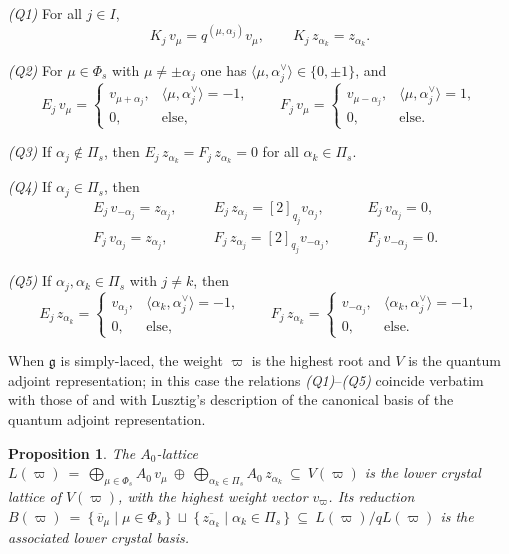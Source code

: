 \documentclass[12pt]{amsart}
\theoremstyle{plain}
\newtheorem{proposition}[theorem]{Proposition}
\theoremstyle{remark}
\newcommand{\g}{\mathfrak{g}}
\newcommand{\vp}{\varpi}
\newcommand{\Phis}{\Phi_{s}}
\newcommand{\Pis}{\Pi_{s}}
\begin{document}
\noindent\emph{(Q1)} For all $j\in I$,
\[
K_j\,v_\mu=q^{(\mu,\alpha_j)}v_\mu,\qquad K_j\,z_{\alpha_k}=z_{\alpha_k}.
\]

\noindent\emph{(Q2)} For $\mu\in\Phis$ with
$\mu\neq\pm\alpha_j$ one has $\langle\mu,\alpha_j^\vee\rangle\in\{0,\pm1\}$, and
\[
E_j\,v_\mu=
\begin{cases}v_{\mu+\alpha_j},&\langle\mu,\alpha_j^\vee\rangle=-1,\\ 0,&\text{else},\end{cases}
\qquad
F_j\,v_\mu=
\begin{cases}v_{\mu-\alpha_j},&\langle\mu,\alpha_j^\vee\rangle=1,\\ 0,&\text{else}.\end{cases}
\]

\noindent\emph{(Q3)} If $\alpha_j\notin\Pis$, then
$E_j\,z_{\alpha_k}=F_j\,z_{\alpha_k}=0$ for all $\alpha_k\in\Pis$.

\noindent\emph{(Q4)} If $\alpha_j\in\Pis$, then
\[
\begin{aligned}
&E_j\,v_{-\alpha_j}=z_{\alpha_j}, &\quad &E_j\,z_{\alpha_j}=[2]_{q_j}v_{\alpha_j}, &\quad &E_j\,v_{\alpha_j}=0,\\
&F_j\,v_{\alpha_j}=z_{\alpha_j}, &\quad &F_j\,z_{\alpha_j}=[2]_{q_j}v_{-\alpha_j}, &\quad &F_j\,v_{-\alpha_j}=0.
\end{aligned}
\]

\noindent\emph{(Q5)} If $\alpha_j,\alpha_k\in\Pis$ with
$j\neq k$, then
\[
E_j\,z_{\alpha_k}=
\begin{cases}v_{\alpha_j},&\langle\alpha_k,\alpha_j^\vee\rangle=-1,\\ 0,&\text{else},\end{cases}
\qquad
F_j\,z_{\alpha_k}=
\begin{cases}v_{-\alpha_j},&\langle\alpha_k,\alpha_j^\vee\rangle=-1,\\ 0,&\text{else}.\end{cases}
\]

When $\g$ is simply-laced, the weight $\vp$ is the highest root
and $V$ is the quantum adjoint representation; in this case the relations
\emph{(Q1)}--\emph{(Q5)} coincide verbatim with those of \cite[Theorem~5.10]{OQY} and
with Lusztig's description \cite{Lusztig} of the canonical basis of the quantum adjoint
representation.

\begin{proposition}\label{prop:crystal}
The $A_0$-lattice $L(\vp)\ =\ \bigoplus_{\mu\in\Phis}A_0\,v_\mu\ \oplus\ \bigoplus_{\alpha_k\in\Pis}A_0\,z_{\alpha_k}\ \subseteq\ V(\vp)$ is the lower crystal lattice of $V(\vp)$, with the highest weight vector $v_{\vp}$. Its reduction $B(\vp)\ =\ \{\,\overline{v}_\mu\mid\mu\in\Phis\,\}\ \sqcup\
\{\,\overline{z_{\alpha_k}}\mid\alpha_k\in\Pis\,\}\ \subseteq\ L(\vp)/qL(\vp)$
is the associated lower crystal basis.
\end{proposition}
\end{document}
